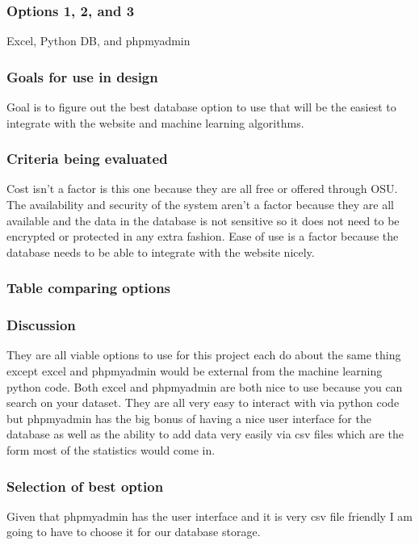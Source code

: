 \documentclass[journal,onecolumn]{IEEEtran}
\begin{document}
\subsubsection{Options 1, 2, and 3}
Excel, Python DB, and phpmyadmin
\subsubsection{Goals for use in design}
Goal is to figure out the best database option to use that will be the easiest to integrate with the website and machine learning algorithms.

\subsubsection{Criteria being evaluated}
Cost isn’t a factor is this one because they are all free or offered through OSU. The availability and security of the system aren’t a factor because they are all available and the data in the database is not sensitive so it does not need to be encrypted or protected in any extra fashion. Ease of use is a factor because the database needs to be able to integrate with the website nicely.

\subsubsection{Table comparing options}


\subsubsection{Discussion}
They are all viable options to use for this project each do about the same thing except excel and phpmyadmin would be external from the machine learning python code. Both excel and phpmyadmin are both nice to use because you can search on your dataset. They are all very easy to interact with via python code but phpmyadmin has the big bonus of having a nice user interface for the database as well as the ability to add data very easily via csv files which are the form most of the statistics would come in.  

\subsubsection{Selection of best option}
Given that phpmyadmin has the user interface and it is very csv file friendly I am going to have to choose it for our database storage.
\end{document}
